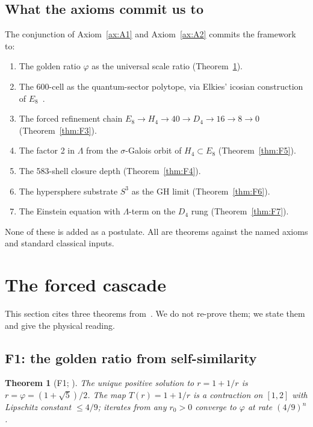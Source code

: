 \documentclass[11pt]{article}
\theoremstyle{plain}
\newtheorem{theorem}{Theorem}[section]
\theoremstyle{definition}
\theoremstyle{remark}
\begin{document}
\subsection{What the axioms commit us to}

The conjunction of Axiom~\ref{ax:A1} and Axiom~\ref{ax:A2} commits the framework to:
\begin{enumerate}
\item The golden ratio $\varphi$ as the universal scale ratio (Theorem~\ref{thm:F1}).
\item The 600-cell as the quantum-sector polytope, via Elkies' icosian construction of $E_8$~\citep{Elkies1990}.
\item The forced refinement chain $E_8 \to H_4 \to 40 \to D_4 \to 16 \to 8 \to 0$ (Theorem~\ref{thm:F3}).
\item The factor 2 in $\Lambda$ from the $\sigma$-Galois orbit of $H_4 \subset E_8$ (Theorem~\ref{thm:F5}).
\item The 583-shell closure depth (Theorem~\ref{thm:F4}).
\item The hypersphere substrate $S^3$ as the GH limit (Theorem~\ref{thm:F6}).
\item The Einstein equation with $\Lambda$-term on the $D_4$ rung (Theorem~\ref{thm:F7}).
\end{enumerate}

None of these is added as a postulate. All are theorems against the named axioms and standard classical inputs.

\section{The forced cascade}\label{sec:cascade}

This section cites three theorems from~\citet{SmartXXXVI}. We do not re-prove them; we state them and give the physical reading.

\subsection{F1: the golden ratio from self-similarity}\label{sec:cascade-F1}

\begin{theorem}[F1; \citealp{SmartXXXVI}]\label{thm:F1}
The unique positive solution to $r = 1 + 1/r$ is $r = \varphi = (1 + \sqrt 5)/2$. The map $T(r) = 1 + 1/r$ is a contraction on $[1, 2]$ with Lipschitz constant $\le 4/9$; iterates from any $r_0 > 0$ converge to $\varphi$ at rate $(4/9)^n$.
\end{theorem}
\end{document}
